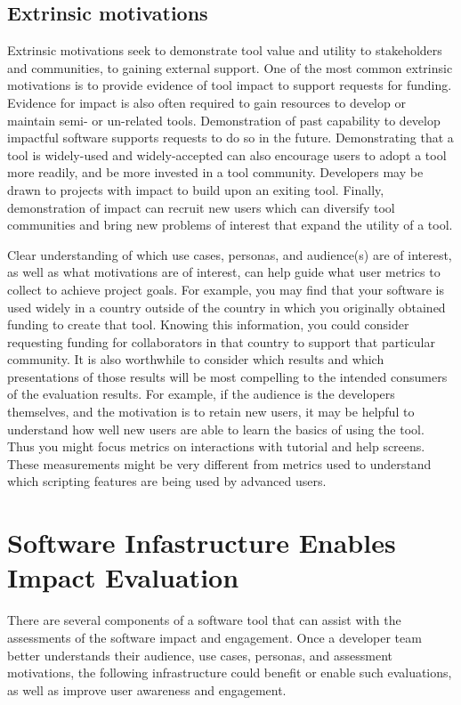\documentclass{article}
\begin{document}
\subsection{Extrinsic motivations}
 
Extrinsic motivations seek to demonstrate tool value and utility to stakeholders and communities, to gaining external support.  One of the most common extrinsic motivations is to provide evidence of tool impact to support requests for funding.  Evidence for impact is also often required to gain resources to develop or maintain semi- or un-related tools. Demonstration of past capability to develop impactful software supports requests to do so in the future.  Demonstrating that a tool is widely-used and widely-accepted can also encourage users to adopt a tool more readily, and be more invested in a tool community. Developers may be drawn to projects with impact to build upon an exiting tool. Finally, demonstration of impact can recruit new  users which can diversify tool communities and bring new problems of interest that expand the utility of a tool.

Clear understanding of which use cases, personas, and audience(s) are of interest, as well as what motivations are of interest, can help guide what user metrics to collect to achieve project goals. For example, you may find that your software is used widely in a country outside of the country in which you originally obtained funding to create that tool. Knowing this information, you could consider requesting funding for collaborators in that country to support that particular community. It is also worthwhile to consider which results and which presentations of those results will be most compelling to the intended consumers of the evaluation results. For example, if the audience is the developers themselves, and the motivation is to retain new users, it may be helpful to understand how well new users are able to learn the basics of using the tool. Thus you might focus metrics on interactions with tutorial and help screens.  These measurements might be very different from metrics used to understand which scripting features are being used by advanced users. 

\section{Software Infastructure Enables Impact Evaluation}
There are several components of a software tool that can assist with the assessments of the software impact and engagement. Once a developer team better understands their audience, use cases, personas, and assessment motivations, the following infrastructure could benefit or enable such evaluations, as well as improve user awareness and engagement. 
\end{document}

